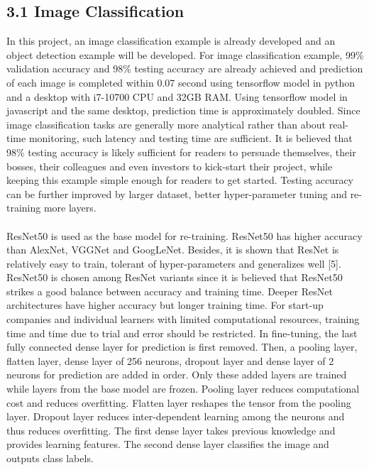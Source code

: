 \documentclass[11pt]{article}
\begin{document}
\subsection*{3.1 \hspace{10pt} Image Classification}
In this project, an image classification example is already developed and an object detection example will be developed. For image classification example, 99\% validation accuracy and 98\% testing accuracy are already achieved and prediction of each image is completed within 0.07 second using tensorflow model in python and a desktop with i7-10700 CPU and 32GB RAM. Using tensorflow model in javascript and the same desktop, prediction time is approximately doubled. Since image classification tasks are generally more analytical rather than about real-time monitoring, such latency and testing time are sufficient. It is believed that 98\% testing accuracy is likely sufficient for readers to persuade themselves, their bosses, their colleagues and even investors to kick-start their project, while keeping this example simple enough for readers to get started. Testing accuracy can be further improved by larger dataset, better hyper-parameter tuning and re-training more layers. \\
\\
ResNet50 is used as the base model for re-training. ResNet50 has higher accuracy than AlexNet, VGGNet and GoogLeNet. Besides, it is shown that ResNet is relatively easy to train, tolerant of hyper-parameters and generalizes well [5]. ResNet50 is chosen among ResNet variants since it is believed that ResNet50 strikes a good balance between accuracy and training time. Deeper ResNet architectures have higher accuracy but longer training time. For start-up companies and individual learners with limited computational resources, training time and time due to trial and error should be restricted. In fine-tuning, the last fully connected dense layer for prediction is first removed. Then, a pooling layer, flatten layer, dense layer of 256 neurons, dropout layer and dense layer of 2 neurons for prediction are added in order. Only these added layers are trained while layers from the base model are frozen. Pooling layer reduces computational cost and reduces overfitting. Flatten layer reshapes the tensor from the pooling layer. Dropout layer reduces inter-dependent learning among the neurons and thus reduces overfitting. The first dense layer takes previous knowledge and provides learning features. The second dense layer classifies the image and outputs class labels.
\end{document}
